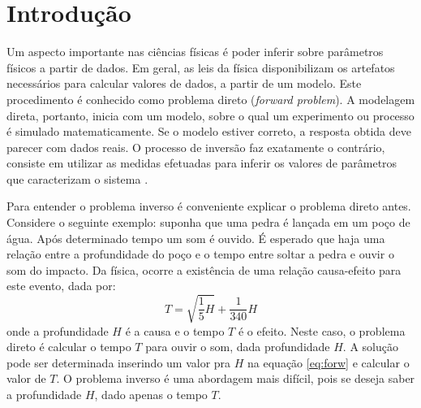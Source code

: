 \chapter{Introdução}
\label{cap:1intro}
% 
Um aspecto importante nas ciências físicas é poder inferir sobre parâmetros
físicos a partir de dados. Em geral, as leis da física disponibilizam os
artefatos necessários para calcular valores de dados, a partir de um modelo.
Este procedimento é conhecido como problema direto (\textit{forward problem}).
A modelagem direta, portanto, inicia com um modelo, sobre o qual um experimento ou processo
é simulado matematicamente. Se o modelo estiver correto, a resposta
obtida deve parecer com dados reais. O processo de inversão faz exatamente o contrário,
consiste em utilizar as medidas efetuadas para inferir os valores de parâmetros que
caracterizam o sistema \citep{tarantola}.

Para entender o problema inverso é conveniente explicar o problema direto antes.
Considere o seguinte exemplo: suponha que uma pedra é lançada em um poço de água.
Após determinado tempo um som é ouvido. É esperado que haja uma relação entre a
profundidade do poço e o tempo entre soltar a pedra e ouvir o som do impacto. Da física,
ocorre a existência de uma relação causa-efeito para este evento, dada por:
\begin{equation}
\label{eq:forw}
T = \sqrt{\frac{1}{5}H} + \frac{1}{340}H
\end{equation}
onde a profundidade $H$ é a causa e o tempo $T$ é o efeito.
Neste caso, o problema direto é calcular o tempo $T$ para ouvir o som, dada profundidade $H$.
A solução pode ser determinada inserindo um valor pra $H$ na equação \ref{eq:forw} e calcular o
valor de $T$. O problema inverso é uma abordagem mais difícil, pois se deseja
saber a profundidade $H$, dado apenas o tempo $T$.


